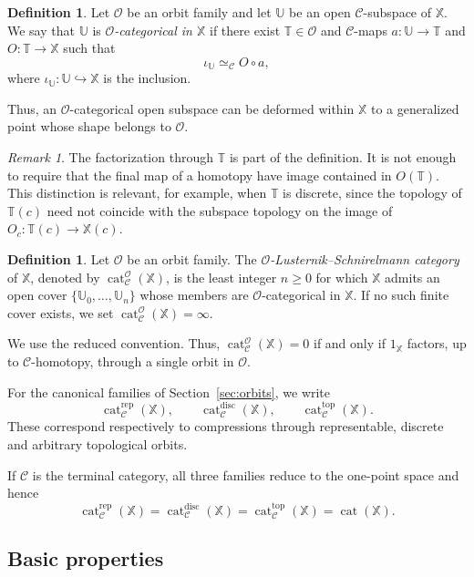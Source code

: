 \documentclass[12pt]{amsart}
\theoremstyle{definition}
\newtheorem{defi}[teo]{Definition}
\theoremstyle{remark}
\newtheorem{rem}{Remark}
\numberwithin{figure}{section}%
\newcommand{\CC}{\mathcal{C}}
\newcommand{\cat}{\mathop{\mathrm{cat}}}
\newcommand{\X}{\mathbb{X}}
\newcommand{\T}{\mathbb{T}}
\newcommand{\Uu}{\mathbb{U}}
\begin{document}
\begin{defi}\label{def:O-categorical-open}
Let $\mathcal O$ be an orbit family and let $\Uu$ be an open
$\CC$-subspace of $\X$. We say that $\Uu$ is
\emph{$\mathcal O$-categorical in $\X$} if there exist
$\T\in\mathcal O$ and $\CC$-maps
$a\colon\Uu\to\T$ and $O\colon\T\to\X$ such that
\[
\iota_{\Uu}\simeq_{\CC}O\circ a,
\]
where $\iota_{\Uu}\colon\Uu\hookrightarrow\X$ is the inclusion.
\end{defi}

Thus, an $\mathcal O$-categorical open subspace can be deformed within
$\X$ to a generalized point whose shape belongs to $\mathcal O$.

\begin{rem}
The factorization through $\T$ is part of the definition. It is not
enough to require that the final map of a homotopy have image contained
in $O(\T)$. This distinction is relevant, for example, when $\T$ is
discrete, since the topology of $\T(c)$ need not coincide with the
subspace topology on the image of $O_c\colon\T(c)\to\X(c)$.
\end{rem}

\begin{defi}\label{def:orbit-relative-category}
Let $\mathcal O$ be an orbit family. The
\emph{$\mathcal O$-Lusternik--Schnirelmann category} of $\X$, denoted
by $\cat_{\CC}^{\mathcal O}(\X)$, is the least integer $n\geq0$ for
which $\X$ admits an open cover
$\{\Uu_0,\ldots,\Uu_n\}$ whose members are
$\mathcal O$-categorical in $\X$. If no such finite cover exists, we
set $\cat_{\CC}^{\mathcal O}(\X)=\infty$.
\end{defi}

We use the reduced convention. Thus,
$\cat_{\CC}^{\mathcal O}(\X)=0$ if and only if
$1_{\X}$ factors, up to $\CC$-homotopy, through a single orbit in
$\mathcal O$.

For the canonical families of Section~\ref{sec:orbits}, we write
\[
\cat_{\CC}^{\mathrm{rep}}(\X),\qquad
\cat_{\CC}^{\mathrm{disc}}(\X),\qquad
\cat_{\CC}^{\mathrm{top}}(\X).
\]
These correspond respectively to compressions through representable,
discrete and arbitrary topological orbits.

If $\CC$ is the terminal category, all three families reduce to the
one-point space and hence
\[
\cat_{\CC}^{\mathrm{rep}}(\X)
=
\cat_{\CC}^{\mathrm{disc}}(\X)
=
\cat_{\CC}^{\mathrm{top}}(\X)
=
\cat(\X).
\]

\subsection{Basic properties}
\end{document}
